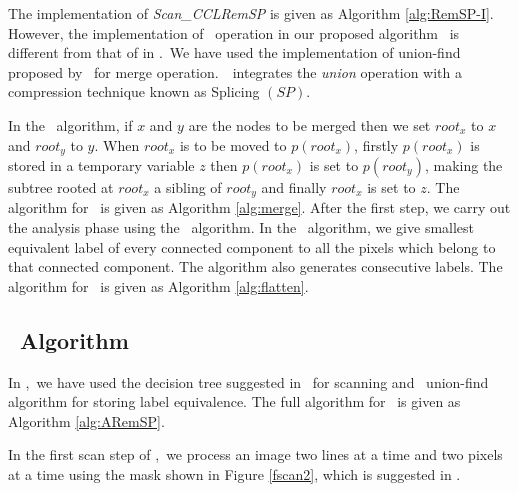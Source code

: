 
% 
The implementation of {\em Scan\_CCLRemSP} is given as Algorithm
\ref{alg:RemSP-I}. However, the implementation of \merge\ operation in our
proposed algorithm \remsp\ is different from that of in \lrpc.\
We have used the implementation of union-find proposed by \rems\ 
for merge operation\cite{Patwary2010_RemSP, Dijkstra1976_RemSP}.\ \rems\ integrates the {\em union}
operation with a compression technique known as Splicing $(SP)$. 

In the \merge\ algorithm, if $x$ and $y$ are the nodes to be merged then we set $root_x$ to $x$ and $root_y$ to $y$. 
When $root_x$ is to be moved to $p(root_x)$, firstly $p(root_x)$ is
stored in a temporary variable $z$ then $p(root_x)$ is set to $p(root_y)$,
making the subtree rooted at $root_x$ a sibling of $root_y$ and finally
$root_x$ is set to $z$. The algorithm for \merge\ is given as Algorithm
\ref{alg:merge}. After the first step, we carry out the analysis phase using the \flatten\ algorithm. In the \flatten\ algorithm, we give smallest equivalent label of every connected component to all the pixels
which belong to that connected component. The algorithm also
generates consecutive labels. The algorithm for \flatten\ is given as Algorithm
\ref{alg:flatten}. 



%
\subsection{\aremsp\ Algorithm}

In \aremsp,\ we have used the decision tree suggested in \arun\ 
for scanning and \rems\ union-find algorithm for storing label equivalence. The
full algorithm for \aremsp\ is given as Algorithm \ref{alg:ARemSP}.

In the first scan step of \aremsp,\ we process an image two lines at a time and
two pixels at a time using the mask shown in Figure \ref{fscan2}, which is
suggested in \cite{He2012_ARun}.


% 



